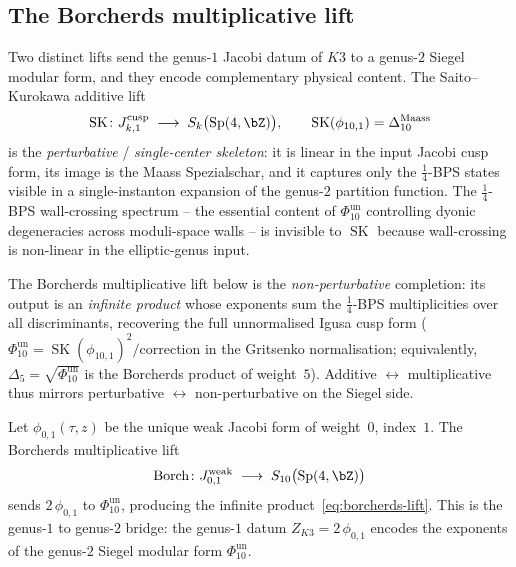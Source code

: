 \subsection{The Borcherds multiplicative lift}
\label{subsec:borcherds-lift}

Two distinct lifts send the genus-$1$ Jacobi datum of
$K3$ to a genus-$2$ Siegel modular form, and they encode
complementary physical content. The Saito--Kurokawa
additive lift
\[
\operatorname{SK}\colon J_{k,1}^{\mathrm{cusp}}
\;\longrightarrow\;
S_k\bigl(\operatorname{Sp}(4,\bZ)\bigr),
\qquad
\operatorname{SK}(\phi_{10,1}) = \Delta_{10}^{\mathrm{Maass}}
\]
is the \emph{perturbative} / \emph{single-center skeleton}:
it is linear in the input Jacobi cusp form, its image is the
Maass Spezialschar, and it captures only the
$\tfrac14$-BPS states visible in a single-instanton
expansion of the genus-$2$ partition function. The
$\tfrac14$-BPS wall-crossing spectrum -- the essential
content of \(\Phi_{10}^{\mathrm{un}}\) controlling dyonic degeneracies
across moduli-space walls -- is invisible to
$\operatorname{SK}$ because wall-crossing is non-linear in
the elliptic-genus input.

The Borcherds multiplicative lift below is the
\emph{non-perturbative} completion: its output is an
\emph{infinite product} whose exponents sum the
$\tfrac14$-BPS multiplicities over all discriminants,
recovering the full unnormalised Igusa cusp form
(\(\Phi_{10}^{\mathrm{un}} = \operatorname{SK}(\phi_{10,1})^2 / \text{correction}\)
in the Gritsenko normalisation; equivalently,
\(\Delta_5 = \sqrt{\Phi_{10}^{\mathrm{un}}}\) is the
Borcherds product of weight~$5$). Additive $\leftrightarrow$
multiplicative thus mirrors perturbative $\leftrightarrow$
non-perturbative on the Siegel side.

\begin{theorem}
\label{thm:borcherds-lift-k3e}
Let $\phi_{0,1}(\tau,z)$ be the unique weak Jacobi form
of weight~$0$, index~$1$. The Borcherds multiplicative
lift
\[
\operatorname{Borch}\colon J_{0,1}^{\mathrm{weak}}
\;\longrightarrow\;
S_{10}\bigl(\operatorname{Sp}(4,\bZ)\bigr)
\]
sends $2\,\phi_{0,1}$ to \(\Phi_{10}^{\mathrm{un}}\), producing the
infinite product~\textup{\eqref{eq:borcherds-lift}}.
This is the genus-$1$ to genus-$2$ bridge: the
genus-$1$ datum $Z_{K3} = 2\,\phi_{0,1}$ encodes
the exponents of the genus-$2$ Siegel modular form
\(\Phi_{10}^{\mathrm{un}}\).
\end{theorem}

